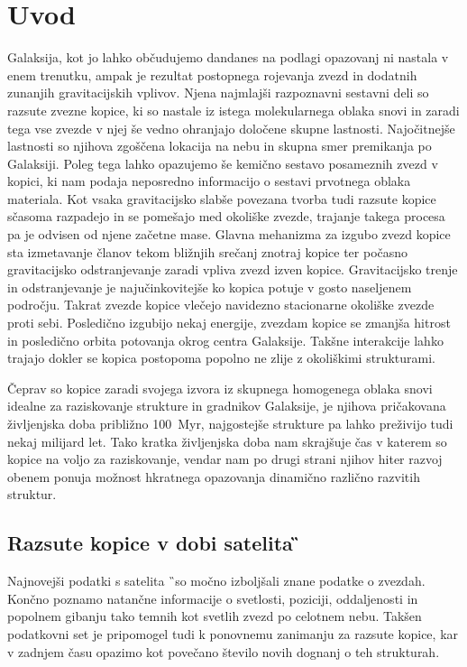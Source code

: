 
\section{Uvod}
\label{sec:slo_uvod}
Galaksija, kot jo lahko občudujemo dandanes na podlagi opazovanj ni nastala v enem trenutku, ampak je rezultat postopnega rojevanja zvezd in dodatnih zunanjih gravitacijskih vplivov. Njena najmlajši razpoznavni sestavni deli so razsute zvezne kopice, ki so nastale iz istega molekularnega oblaka snovi in zaradi tega vse zvezde v njej še vedno ohranjajo določene skupne lastnosti. Najočitnejše lastnosti so njihova zgoščena lokacija na nebu in skupna smer premikanja po Galaksiji. Poleg tega lahko opazujemo še kemično sestavo posameznih zvezd v kopici, ki nam podaja neposredno informacijo o sestavi prvotnega oblaka materiala. Kot vsaka gravitacijsko slabše povezana tvorba tudi razsute kopice sčasoma razpadejo in se pomešajo med okoliške zvezde, trajanje takega procesa pa je odvisen od njene začetne mase. Glavna mehanizma za izgubo zvezd kopice sta izmetavanje članov tekom bližnjih srečanj znotraj kopice ter počasno gravitacijsko odstranjevanje zaradi vpliva zvezd izven kopice. Gravitacijsko trenje in odstranjevanje je najučinkovitejše ko kopica potuje v gosto naseljenem področju.  Takrat zvezde kopice vlečejo navidezno stacionarne okoliške zvezde proti sebi. Posledično izgubijo nekaj energije, zvezdam kopice se zmanjša hitrost in posledično orbita potovanja okrog centra Galaksije. Takšne interakcije lahko trajajo dokler se kopica postopoma popolno ne zlije z okoliškimi strukturami.

Čeprav so kopice zaradi svojega izvora iz skupnega homogenega oblaka snovi idealne za raziskovanje strukture in gradnikov Galaksije, je njihova pričakovana življenjska doba približno 100~Myr, najgostejše strukture pa lahko preživijo tudi nekaj milijard let. Tako kratka življenjska doba nam skrajšuje čas v katerem so kopice na voljo za raziskovanje, vendar nam po drugi strani njihov hiter razvoj obenem ponuja možnost hkratnega opazovanja dinamično različno razvitih struktur.

\subsection{Razsute kopice v dobi satelita \G}
Najnovejši podatki s satelita \G\ so močno izboljšali znane podatke o zvezdah. Končno poznamo natančne informacije o svetlosti, poziciji, oddaljenosti in popolnem gibanju tako temnih kot svetlih zvezd po celotnem nebu. Takšen podatkovni set je pripomogel tudi k ponovnemu zanimanju za razsute kopice, kar v zadnjem času opazimo kot povečano število novih dognanj o teh strukturah.

